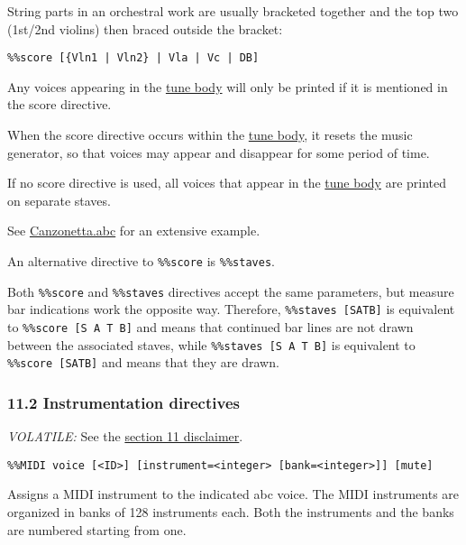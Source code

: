 String parts in an orchestral work are usually bracketed together and
the top two (1st/2nd violins) then braced outside the bracket:

\begin{verbatim}
%%score [{Vln1 | Vln2} | Vla | Vc | DB]
\end{verbatim}

Any voices appearing in the
\protect\hyperlink{tune_body_definition}{tune body} will only be printed
if it is mentioned in the score directive.

When the score directive occurs within the
\protect\hyperlink{tune_body_definition}{tune body}, it resets the music
generator, so that voices may appear and disappear for some period of
time.

If no score directive is used, all voices that appear in the
\protect\hyperlink{tune_body_definition}{tune body} are printed on
separate staves.

See \protect\hyperlink{canzonettaabc}{Canzonetta.abc} for an extensive
example.

An alternative directive to \texttt{\%\%score} is \texttt{\%\%staves}.

Both \texttt{\%\%score} and \texttt{\%\%staves} directives accept the
same parameters, but measure bar indications work the opposite way.
Therefore, \texttt{\%\%staves\ {[}S\textbar{}A\textbar{}T\textbar{}B{]}}
is equivalent to \texttt{\%\%score\ {[}S\ A\ T\ B{]}} and means that
continued bar lines are not drawn between the associated staves, while
\texttt{\%\%staves\ {[}S\ A\ T\ B{]}} is equivalent to
\texttt{\%\%score\ {[}S\textbar{}A\textbar{}T\textbar{}B{]}} and means
that they are drawn.

\hypertarget{instrumentation_directives}{\subsubsection{11.2
Instrumentation directives}\label{instrumentation_directives}}

\emph{VOLATILE:} See the \protect\hyperlink{disclaimer}{section 11
disclaimer}.

\begin{verbatim}
%%MIDI voice [<ID>] [instrument=<integer> [bank=<integer>]] [mute]
\end{verbatim}

Assigns a MIDI instrument to the indicated abc voice. The MIDI
instruments are organized in banks of 128 instruments each. Both the
instruments and the banks are numbered starting from one.

